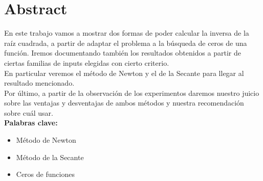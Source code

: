 \section{Abstract}

En este trabajo vamos a mostrar dos formas de poder
calcular la inversa de la raíz cuadrada, a partir de adaptar el problema a la
búsqueda de ceros de una función. Iremos documentando también los resultados
obtenidos a partir de ciertas familias de inputs elegidas con cierto
criterio.\\

En particular veremos el método de Newton y el de la Secante para llegar al
resultado mencionado.\\

Por último, a partir de la observación de los experimentos daremos nuestro juicio sobre las ventajas y desventajas de ambos métodos y nuestra recomendación sobre cuál usar.\\

{\bf Palabras clave:}
\begin{itemize} 
    \item Método de Newton 
    \item Método de la Secante 
    \item Ceros de funciones
\end{itemize}
